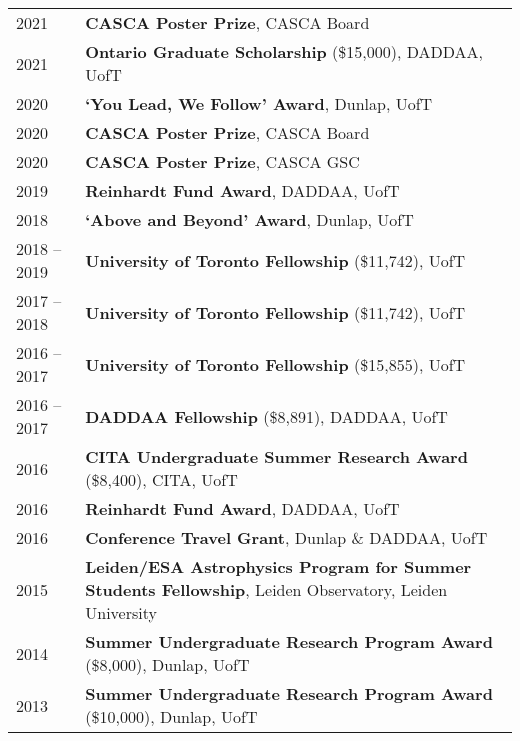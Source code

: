 \documentclass[10pt]{res} %
\begin{document}
\begin{resume}
\begin{table}[h!]
\begin{tabularx}{\textwidth}{lX}
2021 & \textbf{CASCA Poster Prize}, CASCA Board \\
2021 & \textbf{Ontario Graduate Scholarship} (\$15,000), DADDAA, UofT  \\
2020 & \textbf{`You Lead, We Follow' Award}, Dunlap, UofT \\
2020 & \textbf{CASCA Poster Prize}, CASCA Board \\
2020 & \textbf{CASCA Poster Prize}, CASCA GSC \\
2019 & \textbf{Reinhardt Fund Award}, DADDAA, UofT \\
2018 & \textbf{`Above and Beyond' Award}, Dunlap, UofT \\
2018 -- 2019 & \textbf{University of Toronto Fellowship} (\$11,742), UofT \\
2017 -- 2018 & \textbf{University of Toronto Fellowship} (\$11,742), UofT \\
2016 -- 2017 & \textbf{University of Toronto Fellowship} (\$15,855), UofT \\
2016 -- 2017 & \textbf{DADDAA Fellowship} (\$8,891), DADDAA, UofT \\
2016 & \textbf{CITA Undergraduate Summer Research Award} (\$8,400), CITA, UofT \\
2016 & \textbf{Reinhardt Fund Award}, DADDAA, UofT \\
2016 & \textbf{Conference Travel Grant}, Dunlap \& DADDAA, UofT \\
2015 & \textbf{Leiden/ESA Astrophysics Program for Summer Students Fellowship}, Leiden Observatory, Leiden University \\
2014 & \textbf{Summer Undergraduate Research Program Award} (\$8,000), Dunlap, UofT \\
2013 & \textbf{Summer Undergraduate Research Program Award} (\$10,000), Dunlap, UofT
\end{tabularx}
\end{table}



\end{resume}
\end{document}
